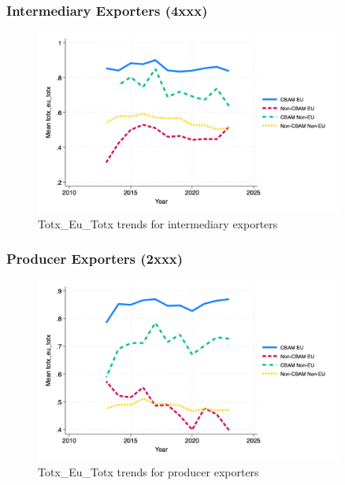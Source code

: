 \documentclass{article}
\begin{document}
\subsubsection{Intermediary Exporters (4xxx)}
\begin{figure}[h!]
\centering
\includegraphics[width=0.9\textwidth]{totx_eu_totx_ei.png}
\caption{Totx_Eu_Totx trends for intermediary exporters}
\label{fig:totx_eu_totx_ei}
\end{figure}

\subsubsection{Producer Exporters (2xxx)}
\begin{figure}[h!]
\centering
\includegraphics[width=0.9\textwidth]{totx_eu_totx_ep.png}
\caption{Totx_Eu_Totx trends for producer exporters}
\label{fig:totx_eu_totx_ep}
\end{figure}
\end{document}

